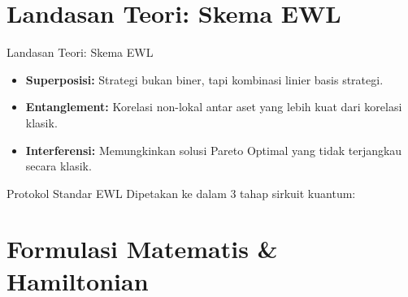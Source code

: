 \documentclass{beamer}
\begin{document}
\section{Landasan Teori: Skema EWL}

\begin{frame}{Landasan Teori: Skema EWL}
    \begin{itemize}
        \item \textbf{Superposisi:} Strategi bukan biner, tapi kombinasi linier basis strategi.
        \item \textbf{Entanglement:} Korelasi non-lokal antar aset yang lebih kuat dari korelasi klasik.
        \item \textbf{Interferensi:} Memungkinkan solusi Pareto Optimal yang tidak terjangkau secara klasik.
    \end{itemize}
\end{frame}

\begin{frame}{Protokol Standar EWL}
    Dipetakan ke dalam 3 tahap sirkuit kuantum:
    
\end{frame}

\section{Formulasi Matematis \& Hamiltonian}
\end{document}
